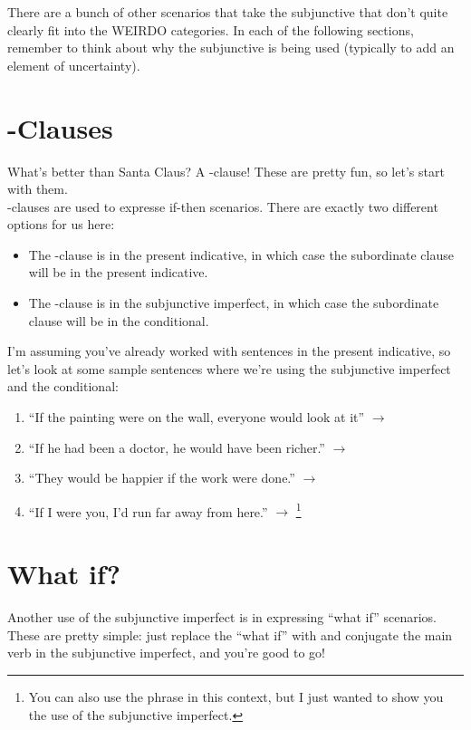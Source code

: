 \label{sec:other}

There are a bunch of other scenarios that take the subjunctive that don't quite clearly fit into the WEIRDO categories. In each of the following sections, remember to think about why the subjunctive is being used (typically to add an element of uncertainty).

\section{-Clauses}

What's better than Santa Claus? A -clause! These are pretty fun, so let's start with them. \\

-clauses are used to expresse if-then scenarios. There are exactly two different options for us here:
\begin{itemize}[noitemsep]
	\item The -clause is in the present indicative, in which case the subordinate clause will be in the present indicative.
	\item The -clause is in the subjunctive imperfect, in which case the subordinate clause will be in the conditional. 
\end{itemize}

I'm assuming you've already worked with sentences in the present indicative, so let's look at some sample sentences where we're using the subjunctive imperfect and the conditional:
\begin{enumerate}[noitemsep]
	\item ``If the painting were on the wall, everyone would look at it'' $\rightarrow$ 
	\item ``If he had been a doctor, he would have been richer.'' $\rightarrow$ 
	\item ``They would be happier if the work were done.'' $\rightarrow$ 
	\item ``If I were you, I'd run far away from here.'' $\rightarrow$ \footnote{You can also use the phrase  in this context, but I just wanted to show you the use of the subjunctive imperfect.}
\end{enumerate}


\section{What if?}
Another use of the subjunctive imperfect is in expressing ``what if'' scenarios. These are pretty simple: just replace the ``what if'' with  and conjugate the main verb in the subjunctive imperfect, and you're good to go!\\

